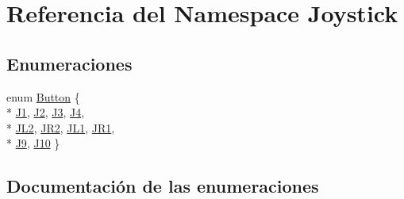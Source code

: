\hypertarget{namespace_joystick}{}\section{Referencia del Namespace Joystick}
\label{namespace_joystick}
\subsection*{Enumeraciones}
\begin{DoxyCompactItemize}
\item 
enum \hyperlink{namespace_joystick_a45a955286b817c291c510e63a0599cd9}{Button} \{ \\*
\hyperlink{namespace_joystick_a45a955286b817c291c510e63a0599cd9a63b74e7ccc7779aef553d92b81759a0a}{J1}, 
\hyperlink{namespace_joystick_a45a955286b817c291c510e63a0599cd9a36507b679fe99250f5958cbbc3cc6132}{J2}, 
\hyperlink{namespace_joystick_a45a955286b817c291c510e63a0599cd9a0553c60acf53734edc3943ebd442ae02}{J3}, 
\hyperlink{namespace_joystick_a45a955286b817c291c510e63a0599cd9a2986428ba01191413fae6916d3db4994}{J4}, 
\\*
\hyperlink{namespace_joystick_a45a955286b817c291c510e63a0599cd9a2cacdc3926f04cacb49518a0f0958118}{J\+L2}, 
\hyperlink{namespace_joystick_a45a955286b817c291c510e63a0599cd9a91ccbdc85939a54630d002ddd456dfc9}{J\+R2}, 
\hyperlink{namespace_joystick_a45a955286b817c291c510e63a0599cd9aa48906615a4b324649b3a23622042084}{J\+L1}, 
\hyperlink{namespace_joystick_a45a955286b817c291c510e63a0599cd9ad92a35f1c2d81ac95d6ed4c9f3ebfdb1}{J\+R1}, 
\\*
\hyperlink{namespace_joystick_a45a955286b817c291c510e63a0599cd9a26c5e50ea6a9ebad80f0f37a4b027e75}{J9}, 
\hyperlink{namespace_joystick_a45a955286b817c291c510e63a0599cd9ab14e67c090b9ce836899f864d8066b41}{J10}
 \}
\end{DoxyCompactItemize}


\subsection{Documentación de las enumeraciones}
\hypertarget{namespace_joystick_a45a955286b817c291c510e63a0599cd9}{}

